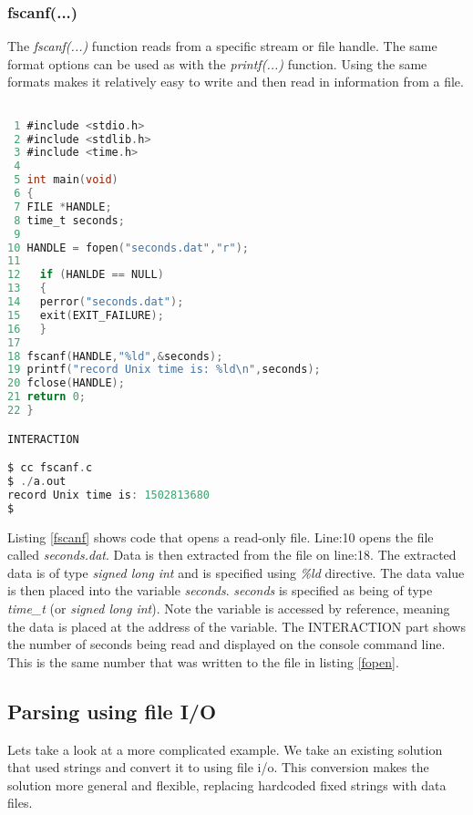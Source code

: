 \subsubsection{fscanf(...)}

The \textit{fscanf(...)} function reads from a specific stream or file handle. The same format options can be used as with the \textit{printf(...)} function. Using the same formats makes it relatively easy to write and then read in information from a file.


\begin{lstlisting}[language=C,showstringspaces=false, caption={File: fscanf.c},captionpos=b,label=fscanf]

 1 #include <stdio.h>
 2 #include <stdlib.h>
 3 #include <time.h>
 4 
 5 int main(void)
 6 {
 7 FILE *HANDLE;
 8 time_t seconds;
 9 
10 HANDLE = fopen("seconds.dat","r");
11 
12   if (HANLDE == NULL)
13   {
14   perror("seconds.dat");
15   exit(EXIT_FAILURE);
16   }
17 
18 fscanf(HANDLE,"%ld",&seconds);
19 printf("record Unix time is: %ld\n",seconds);
20 fclose(HANDLE);
21 return 0;
22 }

INTERACTION

$ cc fscanf.c
$ ./a.out
record Unix time is: 1502813680
$ 

\end{lstlisting}

Listing \ref{fscanf} shows code that opens a read-only file. Line:10 opens the file called \textit{seconds.dat}. Data is then extracted from the file on line:18. The extracted data is of type \textit{signed long int} and is specified using \textit{\%ld} directive. The data value is then placed into the variable \textit{seconds}. \textit{seconds} is specified as being of type \textit{time\_t} (or \textit{signed long int}). Note the variable is accessed by reference, meaning the data is placed at the address of the variable. The INTERACTION part shows the number of seconds being read and displayed on the console command line. This is the same number that was written to the file in listing \ref{fopen}.


\subsection{Parsing using file I/O}

Lets take a look at a more complicated example. We take an existing solution that used strings and convert it to using file i/o. This conversion makes the solution more general and flexible, replacing hardcoded fixed strings with data files.

